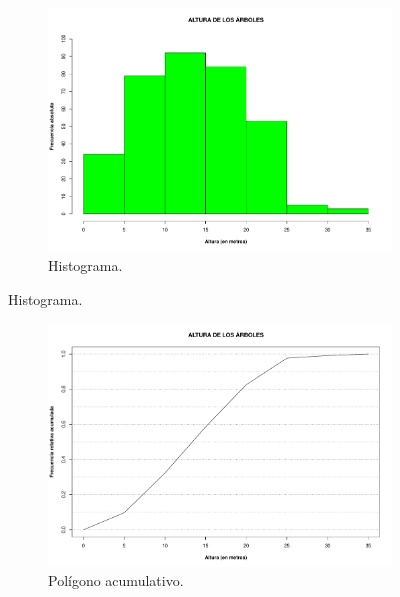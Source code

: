 \documentclass[11pt]{article}
\begin{document}
\begin{figure}[h!]
  \begin{center}
    \begin{subfigure}[b]{0.9\linewidth}
      \includegraphics[width=\linewidth]{histAltura.pdf}
      \caption{Histograma.}
      \label{fig:histAltura}
    \end{subfigure}
  \end{center}
\end{figure}

\newpage

\begin{figure}[h!]
  \ContinuedFloat
  \begin{center}
    \begin{subfigure}[b]{0.9\linewidth}
      \includegraphics[width=\linewidth]{acumAltura.pdf}
      \caption{Polígono acumulativo.}
      \label{fig:acumAltura}
    \end{subfigure}
  \caption{}
  \end{center}  
\end{figure}
\end{document}

